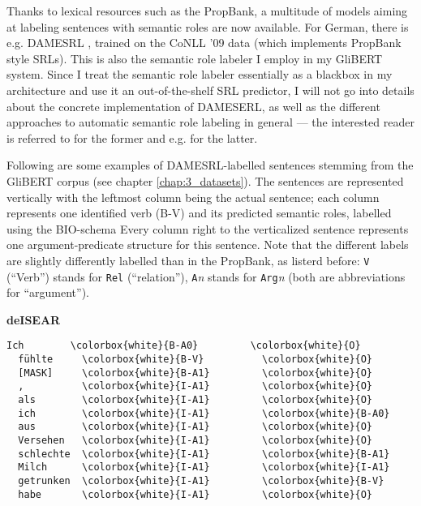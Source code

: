 
Thanks to lexical resources such as the PropBank, a multitude of models
aiming at labeling sentences with semantic roles are now available. For
German, there is e.g. DAMESRL \citep{do2018flexible}, trained on the CoNLL
'09 \citep{hajivc2009conll} data (which implements PropBank style SRLs).
This is also the semantic role labeler I employ in my GliBERT system.
Since I treat the semantic role labeler essentially as a blackbox in my
architecture and use it an out-of-the-shelf SRL predictor, I will not go
into details about the concrete implementation of DAMESERL, as well as the
different approaches to automatic semantic role labeling in general ---
the interested reader is referred to \cite{do2018flexible} for the former
and e.g. \cite{palmer2010semantic} for the latter.

Following are some examples of DAMESRL-labelled sentences stemming from the GliBERT corpus (see
chapter \ref{chap:3_datasets}). The sentences are represented vertically with the leftmost column
being the actual sentence; each column represents one identified verb (B-V) and its predicted
semantic roles, labelled using the BIO-schema Every column
right to the verticalized sentence represents one argument-predicate structure for this sentence.
Note that the different labels are slightly differently labelled than in the PropBank, as listerd
before: \texttt{V} (``Verb'') stands for \texttt{Rel} (``relation''), \texttt{A}\textit{n} stands
for \texttt{Arg}\textit{n} (both are abbreviations for ``argument'').

\textbf{deISEAR}

\begin{Verbatim}[commandchars=\\\{\}]
  Ich        \colorbox{white}{B-A0}         \colorbox{white}{O}
  fühlte     \colorbox{white}{B-V}          \colorbox{white}{O}
  [MASK]     \colorbox{white}{B-A1}         \colorbox{white}{O}
  ,          \colorbox{white}{I-A1}         \colorbox{white}{O}
  als        \colorbox{white}{I-A1}         \colorbox{white}{O}
  ich        \colorbox{white}{I-A1}         \colorbox{white}{B-A0}
  aus        \colorbox{white}{I-A1}         \colorbox{white}{O}
  Versehen   \colorbox{white}{I-A1}         \colorbox{white}{O}
  schlechte  \colorbox{white}{I-A1}         \colorbox{white}{B-A1}
  Milch      \colorbox{white}{I-A1}         \colorbox{white}{I-A1}
  getrunken  \colorbox{white}{I-A1}         \colorbox{white}{B-V}
  habe       \colorbox{white}{I-A1}         \colorbox{white}{O}
\end{Verbatim}

